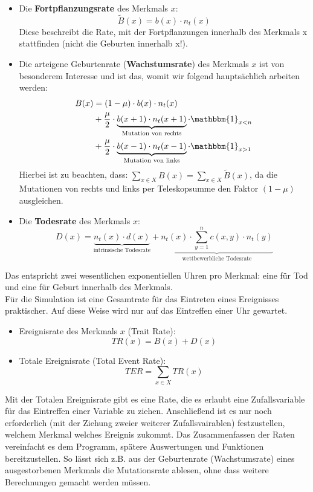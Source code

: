 \documentclass[11pt, a4paper, german]{article}
\theoremstyle{plain}
\begin{document}
	\begin{itemize}
		\item Die \textbf{Fortpflanzungsrate} des Merkmals $ x $: 
		\[ \tilde{B}(x) = b(x) \cdot n_t(x) \]
		Diese beschreibt die Rate, mit der Fortpflanzungen innerhalb des Merkmals x stattfinden (nicht die Geburten innerhalb x!).\\
		\item Die arteigene Geburtenrate (\textbf{Wachstumsrate}) des Merkmals $ x $ ist von besonderem Interesse und ist das, womit wir folgend hauptsächlich arbeiten werden: 
		\begin{align*}
			B(x)  & = (1 - \mu) \cdot b(x) \cdot n_t(x)\\
				  & + \frac{\mu}{2} \cdot \underbrace{b(x+1) \cdot n_t(x+1)}_{\text{Mutation von rechts}} \cdot \mathbbm{1}_{x<n}\\
				  & + \frac{\mu}{2} \cdot \underbrace{b(x-1) \cdot n_t(x-1)}_{\text{Mutation von links}} \cdot \mathbbm{1}_{x>1}
		\end{align*}
		Hierbei ist zu beachten, dass: $ \sum_{x \in X} B(x)  = \sum_{x \in X} \tilde{B}(x)$, da die Mutationen von rechts und links per Teleskopsumme den Faktor $ (1-\mu) $ ausgleichen.
		
		\item Die \textbf{Todesrate} des Merkmals $ x $:
		\[ D(x) = \underbrace{n_t(x) \cdot d(x)}_{\text{intrinsische Todesrate}} + \underbrace{n_t(x) \cdot \sum_{y=1}^{n} c(x,y) \cdot n_t(y)}_{\text{wettbewerbliche Todesrate}}  \]
	\end{itemize}
	Das entspricht zwei wesentlichen exponentiellen Uhren pro Merkmal: eine für Tod und eine für Geburt innerhalb des Merkmals.\\
	Für die Simulation ist eine Gesamtrate für das Eintreten eines Ereignisses praktischer. Auf diese Weise wird nur auf das Eintreffen einer Uhr gewartet.
	\begin{itemize}
		\item Ereignisrate des Merkmals $ x $ (Trait Rate):
		\[ TR(x) = B(x) + D(x) \]
		\item Totale Ereignisrate (Total Event Rate): 
		\[ TER = \sum_{x \in X} TR(x)\]
	\end{itemize}
	Mit der Totalen Ereignisrate gibt es eine Rate, die es erlaubt eine Zufallsvariable für das Eintreffen einer Variable zu ziehen. Anschließend ist es nur noch erforderlich (mit der Ziehung zweier weiterer Zufallsvairablen) festzustellen, welchem Merkmal welches Ereignis zukommt. Das Zusammenfassen der Raten vereinfacht es dem Programm, spätere Auswertungen und Funktionen bereitzustellen. So lässt sich z.B. aus der Geburtenrate (Wachstumsrate) eines ausgestorbenen Merkmals die Mutationsrate ablesen, ohne dass weitere Berechnungen gemacht werden müssen.\\
	
\end{document}
